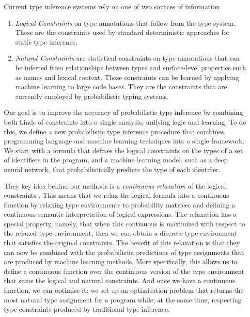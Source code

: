\documentclass[acmsmall, review, anonymous]{acmart}\settopmatter{printfolios=true,printccs=false,printacmref=false}
\begin{document}
Current type inference systems rely
on one of two sources of information
\begin{enumerate}[label=(\Roman*)]
	\item \emph{Logical Constraints} on type annotations that follow from the type system.
	      These are the  constraints used by standard deterministic approaches for static type inference.
	\item \emph{Natural Constraints} are statistical constraints on type annotations
	      that can be inferred from relationships between types and surface-level properties such as names and lexical context.
	      These constraints can be learned by applying machine learning to large code bases.
	      They are the constraints that are currently employed by probabilistic typing systems.
\end{enumerate}
Our goal is to improve the accuracy of probabilistic type
inference by combining both kinds of constraints into a single analysis, unifying logic and learning.
To do this, we define a new probabilistic type inference procedure that combines
programming language and machine learning techniques into a single framework.
We start with a formula that defines the logical constraints on the types of a set of identifiers in the program,
and a machine learning model, such as a deep neural network, that probabilistically predicts the type of each identifier.

They key idea behind our methods is a
\emph{continuous relaxation} of
the logical constraints \cite{hajek98}.
This means that  we relax the logical formula into a continuous function by relaxing type environments
to probability matrices and defining
a continuous semantic interpretation of logical expressions.
The relaxation has a special property, namely,
that when this continuous is maximized with respect
to the relaxed type environment, then we
can obtain a discrete type environment
that satisfies the original constraints.
The benefit of this relaxation is that they
can now be combined with the probabilistic
predictions of type assignments that are
produced by machine learning methods.
More specifically, this allows us to define a continuous function over the continuous version of the type environment
that sums the logical and natural constraints.
And once we have a continuous function, we can optimise it:
we set up an optimisation problem that returns the most natural type assignment for a
program while, at the same time, respecting type constraints produced by traditional type inference.
\end{document}

